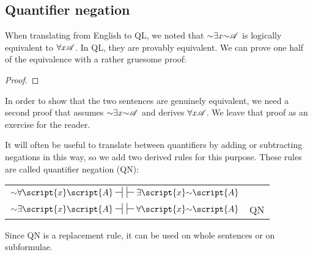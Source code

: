 \subsection{Quantifier negation}

When translating from English to QL, we noted that $\mathord{\sim}\exists x\mathord{\sim}\mathscr{A}$ is logically equivalent to $\forall x\mathscr{A}$. In QL, they are provably equivalent. We can prove one half of the equivalence with a rather gruesome proof:

\begin{proof}
	 
	\open
		\open
			\open
			\close
		\close
	\close
\end{proof}

In order to show that the two sentences are genuinely equivalent, we need a second proof that assumes $\mathord{\sim}\exists x\mathord{\sim}\mathscr{A}$ and derives $\forall x\mathscr{A}$. We leave that proof as an exercise for the reader.

It will often be useful to translate between quantifiers by adding or subtracting negations in this way, so we add two derived rules for this purpose. These rules are called quantifier negation (QN):
\begin{center}
\begin{tabular}{rl}
$\enot\forall\script{x}\script{A} \nsststile{}{} \hspace{.5em} \sststile{}{} \exists\script{x}\enot\script{A}$\\
$\enot\exists\script{x}\script{A} \nsststile{}{}  \hspace{.5em} \sststile{}{} \forall\script{x}\enot\script{A}$
& QN
\end{tabular}
\end{center}
Since QN is a replacement rule, it can be used on whole sentences or on subformulae.



\practiceproblems

